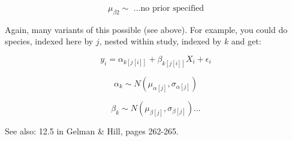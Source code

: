 \documentclass[12pt,a4paper]{article}
\begin{document}
\begin{equation}
\mu_{\beta 2}\sim \text{ ...no prior specified}
\end{equation}

\vspace{2ex}
\noindent Again, many variants of this possible (see above). For example, you could do species, indexed here by $j$, nested within study, indexed by $k$ and get:

\begin{equation}
y_{i}=\alpha_{k[j[i]]}+\beta_{k[j[i]]}X_{i}+\epsilon_{i}
\end{equation}

\begin{equation}
\alpha_{k} \sim N(\mu_{\alpha[j]}, \sigma_{\alpha[j]})
\end{equation}


\begin{equation}
\beta_{k} \sim N(\mu_{\beta[j]}, \sigma_{\beta[j]})...
\end{equation}

\vspace{2ex}

\noindent See also: 12.5 in Gelman \& Hill, pages 262-265.
\end{document}
